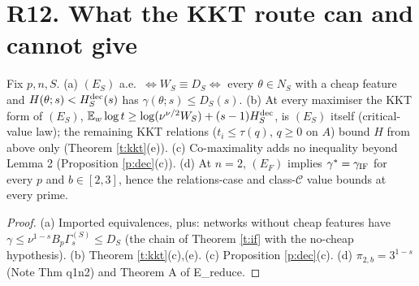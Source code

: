 \documentclass[11pt]{article}
\theoremstyle{remark}\newtheorem{remark}[theorem]{Remark}
\newcommand{\E}{\mathbb E}\newcommand{\R}{\mathbb R}\newcommand{\Re}{\operatorname{Re}}
\begin{document}
\section{R12. What the KKT route can and cannot give}
\begin{proposition}\label{p:obs}
Fix $p,n,S$. (a) $(E_S)$ a.e.\ $\iff W_S\equiv D_S\iff$ every $\theta\in N_S$ with a cheap feature and $H(\theta;s)<H^{\rm dec}_S(s)$ has $\gamma(\theta;s)\le D_S(s)$.
(b) At every maximiser the KKT form of $(E_S)$, $\E_w\log t\ge\log(\nu^{\nu/2}W_S)+(s-1)H^{\rm dec}_S$, is $(E_S)$ itself (critical-value law); the remaining KKT relations
($t_i\le\tau(q)$, $q\ge0$ on $A$) bound $H$ from above only (Theorem \ref{t:kkt}(e)).
(c) Co-maximality adds no inequality beyond Lemma 2 (Proposition \ref{p:dec}(c)).
(d) At $n=2$, $(E_F)$ implies $\gamma^*=\gamma_{\rm IF}$ for every $p$ and $b\in[2,3]$, hence the relations-case and class-$\mathcal C$ value bounds at every prime.
\end{proposition}
\begin{proof}
(a) Imported equivalences, plus: networks without cheap features have $\gamma\le\nu^{1-s}B_p\Gamma^{(S)}_s\le D_S$ (the chain of Theorem \ref{t:if} with the no-cheap
hypothesis). (b) Theorem \ref{t:kkt}(c),(e). (c) Proposition \ref{p:dec}(c). (d) $\pi_{2,b}=3^{1-s}$ (Note Thm q1n2) and Theorem A of E\_reduce.
\end{proof}
\end{document}
